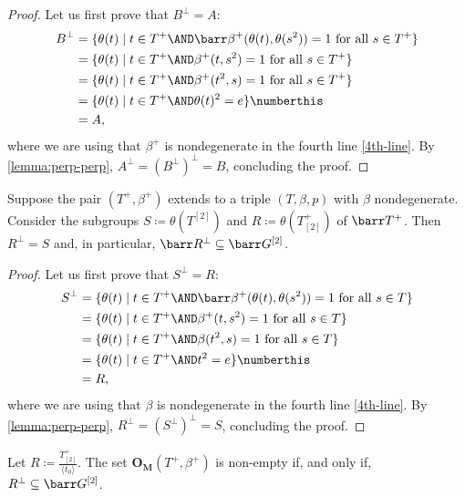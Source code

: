 \begin{proof}
    Let us first prove that $B^\perp = A$:
	\begin{align}
		B^\perp & = \{ \theta(t) \mid t\in T^+ \AND \barr\beta^+ (\theta (t), \theta (s^2)) = 1 \text{ for all } s\in T^+ \}\\ 
		& = \{\theta(t) \mid t\in T^+ \AND \beta^+ (t, s^2) = 1 \text{ for all } s\in T^+\}\\ 
		& = \{ \theta(t) \mid t\in T^+ \AND \beta^+ (t^2, s) = 1 \text{ for all } s\in T^+\}\\ 
		& = \{ \theta(t) \mid t\in T^+ \AND \theta(t)^2=e \} \numberthis\label{4th-line-again} \\ 
		&= A,
	\end{align}
	where we are using that $\beta^+$ is nondegenerate in the fourth line \eqref{4th-line}. 
	By \cref{lemma:perp-perp}, $A^\perp = (B^\perp)^\perp = B$, concluding the proof.
\end{proof}

\begin{prop}\label{prop:square-subgroup}
    Suppose the pair $(T^+, \beta^+)$ extends to a triple $(T, \beta, p)$ with $\beta$ nondegenerate. 
	Consider the subgroups $S \coloneqq \theta(T^{[2]})$ and $R \coloneqq \theta(T^+_{[2]})$ of $\barr T^+$. 
	Then $R^\perp = S$ and, in particular, $\barr R^\perp \subseteq \barr G^{[2]}$.
\end{prop}

\begin{proof}
	Let us first prove that $S^\perp = R$:
	\begin{align}
		S^\perp & = \{ \theta(t) \mid t\in T^+ \AND \barr\beta^+ (\theta (t), \theta (s^2)) = 1 \text{ for all }s\in T\}\\ 
		& = \{\theta(t) \mid t\in T^+ \AND \beta^+ (t, s^2) = 1 \text{ for all }s\in T\}\\ 
		& = \{ \theta(t) \mid t\in T^+ \AND \beta (t^2, s) =1 \text{ for all }s\in T\}\\ 
		& = \{ \theta(t) \mid t\in T^+ \AND t^2=e \} \numberthis\label{4th-line} \\ 
		&= R,
	\end{align}
	where we are using that $\beta$ is nondegenerate in the fourth line \eqref{4th-line}. 
	By \cref{lemma:perp-perp}, $R^\perp = (S^\perp)^\perp = S$, concluding the proof.
\end{proof}


\begin{prop}
    Let $R \coloneqq \frac{T^+_{[2]}}{\langle t_0 \rangle}$. 
    The set $\mathbf{O_M}(T^+, \beta^+)$ is non-empty if, and only if, $R^\perp \subseteq \barr G^{[2]}$.
\end{prop}

